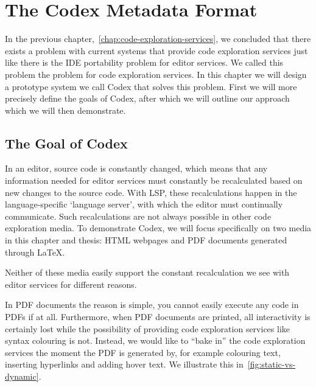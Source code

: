 

\chapter{The Codex Metadata Format}
\label{chap:codex}

In the previous chapter,~\cref{chap:code-exploration-services}, we concluded that there exists a problem with current
systems that provide code exploration services just like there is the IDE portability problem for editor services.
We called this problem the \problem{\times} problem for code exploration services.
In this chapter we will design a prototype system we call Codex that solves this problem.
First we will more precisely define the goals of Codex, after which we will outline our approach which we will then demonstrate.

\section{The Goal of Codex}\label{sec:the-goal-of-codex}


In an editor, source code is constantly changed, which means that any information needed for editor services must constantly be recalculated based on new changes to the source code.
With \ac{LSP}, these recalculations happen in the language-specific `language server', with which the editor must continually communicate.
Such recalculations are not always possible in other code exploration media.
To demonstrate Codex, we will focus specifically on two media in this chapter and thesis: HTML webpages and PDF documents generated through LaTeX.

Neither of these media easily support the constant recalculation we see with editor services for different reasons.

In PDF documents the reason is simple, you cannot easily execute any code in PDFs if at all.
Furthermore, when PDF documents are printed, all interactivity is certainly lost while the possibility of providing code exploration services like syntax colouring is not.
Instead, we would like to ``bake in'' the code exploration services the moment the PDF is generated by, for example colouring text, inserting hyperlinks and adding hover text.
We illustrate this in~\cref{fig:static-vs-dynamic}.

